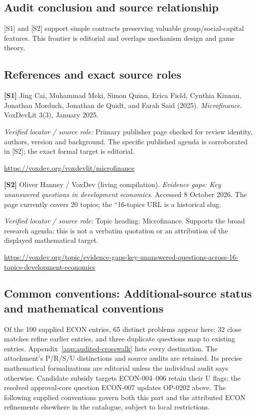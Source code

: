 \documentclass[11pt,a4paper]{article}
\begin{document}
\subsection*{Audit conclusion and source relationship}

[S1] and [S2] support simple contracts preserving valuable group/social-capital features. This frontier is editorial and overlaps mechanism design and game theory.

\subsection*{References and exact source roles}

{\footnotesize\raggedright
\par\noindent\textbf{[S1]} Jing Cai, Muhammad Meki, Simon Quinn, Erica Field, Cynthia Kinnan, Jonathan Morduch, Jonathan de Quidt, and Farah Said (2025). \emph{Microfinance}. VoxDevLit 3(3), January 2025.\par \textit{Verified locator / source role:} Primary publisher page checked for review identity, authors, version and background. The specific published agenda is corroborated in [S2]; the exact formal target is editorial.\par \url{https://voxdev.org/voxdevlit/microfinance}\par\smallskip
\par\noindent\textbf{[S2]} Oliver Hanney / VoxDev (living compilation). \emph{Evidence gaps: Key unanswered questions in development economics}. Accessed 8 October 2026. The page currently covers 20 topics; the ``16-topics URL is a historical slug.\par \textit{Verified locator / source role:} Topic heading: Microfinance. Supports the broad research agenda; this is not a verbatim quotation or an attribution of the displayed mathematical target.\par \url{https://voxdev.org/topic/evidence-gaps-key-unanswered-questions-across-16-topics-development-economics}\par\smallskip
}

\subsection*{Common conventions: Additional-source status and mathematical conventions}

\label{audited:conventions}

Of the 100 supplied ECON entries, 65 distinct problems appear here; 32 close
matches refine earlier entries, and three duplicate questions map to existing
entries. Appendix~\ref{app:audited-crosswalk} lists every destination.
The attachment's P/R/S/U distinctions and source audits are retained. Its
precise mathematical formalizations are editorial unless the individual audit
says otherwise. Candidate subsidy targets ECON-004--006 retain their U flags;
the resolved approval-core question ECON-007 updates OP-0202 above.
The following supplied conventions govern both this part and the attributed
ECON refinements elsewhere in the catalogue, subject to local restrictions.
\end{document}
